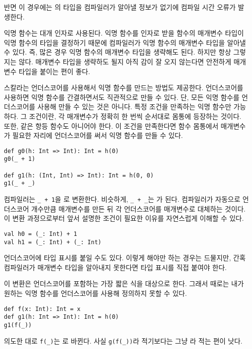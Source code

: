 반면 이 경우에는 의 타입을 컴파일러가 알아낼 정보가 없기에 컴파일 시간
오류가 발생한다.

익명 함수는 대개 인자로 사용된다. 익명 함수를 인자로 받을 함수의 매개변수 타입이
익명 함수의 타입을 결정하기 때문에 컴파일러가 익명 함수의 매개변수 타입을 알아낼
수 있다. 즉, 많은 경우 익명 함수의 매개변수 타입을 생략해도 된다. 하지만 항상
그렇지는 않다. 매개변수 타입을 생략하도 될지 아직 감이 잘 오지 않는다면 안전하게
매개변수 타입을 붙이는 편이 좋다.

스칼라는 언더스코어를 사용해서 익명 함수를 만드는 방법도 제공한다. 언더스코어를
사용하면 익명 함수를 간결하면서도 직관적으로 만들 수 있다. 단, 모든 익명 함수를
언더스코어를 사용해 만들 수 있는 것은 아니다. 특정 조건을 만족하는 익명 함수만
가능하다. 그 조건이란, 각 매개변수가 정확히 한 번씩 순서대로 몸통에 등장하는
것이다. 또한,  같은 항등 함수도 아니어야 한다. 이 조건을
만족한다면 함수 몸통에서 매개변수가 필요한 자리에 언더스코어를 써서 익명 함수를
만들 수 있다.

\begin{verbatim}
def g0(h: Int => Int): Int = h(0)
g0(_ + 1)

def g1(h: (Int, Int) => Int): Int = h(0, 0)
g1(_ + _)
\end{verbatim}

컴파일러는 \verb!_ + 1!을 로 변환한다. 비슷하게, \verb!_ + _!는
가 된다. 컴파일러가 자동으로 언더스코어 개수만큼
매개변수를 만든 뒤 각 언더스코어를 매개변수로 대체하는 것이다. 이 변환
과정으로부터 앞서 설명한 조건이 필요한 이유를 자연스럽게 이해할 수 있다.

\begin{verbatim}
val h0 = (_: Int) + 1
val h1 = (_: Int) + (_: Int)
\end{verbatim}

언더스코어에 타입 표시를 붙일 수도 있다. 이렇게 해야만 하는 경우는 드물지만,
간혹 컴파일러가 매개변수 타입을 알아내지 못한다면 타입 표시를 직접 붙여야 한다.

이 변환은 언더스코어를 포함하는 가장 짧은 식을 대상으로 한다. 그래서 때로는 내가
원하는 익명 함수를 언더스코어를 사용해 정의하지 못할 수 있다.

\begin{verbatim}
def f(x: Int): Int = x
def g1(h: Int => Int): Int = h(0)
g1(f(_))
\end{verbatim}

의도한 대로 \verb!f(_)!는 로 바뀐다. 사실 \verb!g(f(_))!라
적기보다는 그냥 라 적는 편이 낫다.

